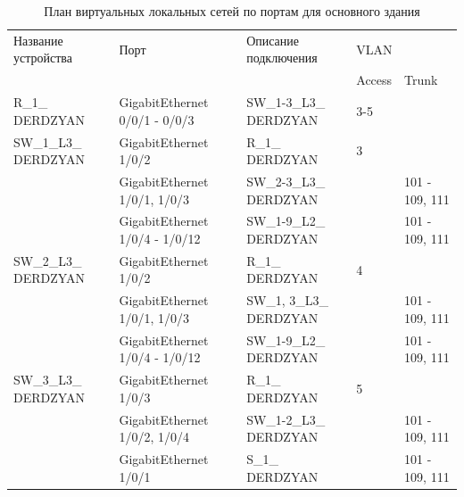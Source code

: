 \begin{table}[H]
    \centering
	\caption{План виртуальных локальных сетей по портам для основного здания\label{table:VLAN_plan_oz}}
    \small
	\begin{tabularx}{\textwidth}{|X|X|X|X|X|}
        \hline
		Название устройства	&	Порт	& Описание подключения 	& \multicolumn{2}{X|}{VLAN} \\
		\cline{4-5}
							&			&						&	Access	&	Trunk \\
		\hline
		R\_1\_ DERDZYAN & GigabitEthernet 0/0/1 - 0/0/3 & SW\_1-3\_L3\_ DERDZYAN & 3-5 &	 \\
		\hline
		SW\_1\_L3\_ DERDZYAN & GigabitEthernet 1/0/2 &  R\_1\_ DERDZYAN &  3 &	\\
		\cline{2-5}
			& GigabitEthernet 1/0/1, 1/0/3 & SW\_2-3\_L3\_ DERDZYAN & 	&	101 - 109, 111	\\
		\cline{2-5}
			& GigabitEthernet 1/0/4 - 1/0/12 & SW\_1-9\_L2\_ DERDZYAN & &	101 - 109, 111	\\
		\hline
		SW\_2\_L3\_ DERDZYAN & GigabitEthernet 1/0/2 &  R\_1\_ DERDZYAN & 4 &	\\
		\cline{2-5}
			& GigabitEthernet 1/0/1, 1/0/3 & SW\_1, 3\_L3\_ DERDZYAN & & 101 - 109, 111\\
		\cline{2-5}
			& GigabitEthernet 1/0/4 - 1/0/12 & SW\_1-9\_L2\_ DERDZYAN & & 101 - 109, 111\\
		\hline
		SW\_3\_L3\_ DERDZYAN & GigabitEthernet 1/0/3 &  R\_1\_ DERDZYAN & 5 & \\
		\cline{2-5}
			& GigabitEthernet 1/0/2, 1/0/4 & SW\_1-2\_L3\_ DERDZYAN & & 101 - 109, 111\\
		\cline{2-5}
			& GigabitEthernet 1/0/1 & S\_1\_ DERDZYAN & & 101 - 109, 111\\
    \end{tabularx}
\end{table}



